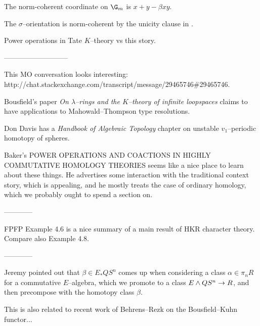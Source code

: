 \begin{example}
The norm-coherent coordinate on $\G_m$ is $x + y - \beta x y$.
\end{example}


\begin{example}
The $\sigma$--orientation is norm-coherent by the unicity clause in .
\end{example}



\begin{remark}
Power operations in Tate $K$--theory vs this story.
\end{remark}











---------------------------

This MO conversation looks interesting: http://chat.stackexchange.com/transcript/message/29465746\#29465746.

Bousfield's paper \textit{On $\lambda$--rings and the $K$--theory of infinite loopspaces} claims to have applications to Mahowald--Thompson type resolutions.

Don Davis has a \textit{Handbook of Algebraic Topology} chapter on unstable $v_1$--periodic homotopy of spheres.

Baker's POWER OPERATIONS AND COACTIONS IN HIGHLY COMMUTATIVE HOMOLOGY THEORIES seems like a nice place to learn about these things. He advertises some interaction with the traditional context story, which is appealing, and he mostly treats the case of ordinary homology, which we probably ought to spend a section on.


------------

FPFP Example 4.6 is a nice summary of a main result of HKR character theory.  Compare also Example 4.8.

------------


Jeremy pointed out that $\beta \in E_* QS^n$ comes up when considering a class $\alpha \in \pi_n R$ for a commutative $E$--algebra, which we promote to a class $E \wedge QS^n \to R$, and then precompose with the homotopy class $\beta$.

This is also related to recent work of Behrens--Rezk on the Bousfield--Kuhn functor...






